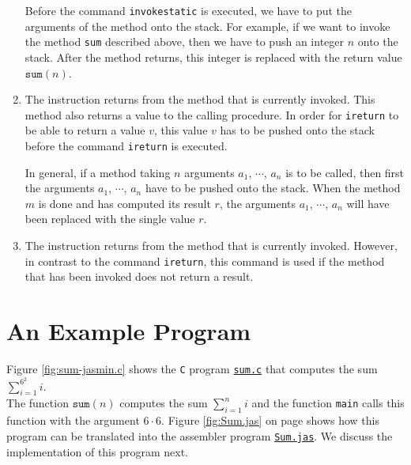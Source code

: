 \begin{enumerate}
      Before the command \texttt{invokestatic} is executed, we have to put the arguments of the method
      onto the stack.  For example, if we want to invoke the method \texttt{sum} described  above, then we
      have to push an integer $n$ onto the stack.  After the method returns, this integer is replaced with the
      return value $\mathtt{sum}(n)$.
\item The instruction 
      returns from the method that is currently invoked.  This method also returns a value to the calling
      procedure.  In order for \texttt{ireturn} to be able to return a value $v$, this value $v$ has to be
      pushed onto the stack before the command \texttt{ireturn} is executed.

      In general, if a method taking $n$ arguments $a_1$, $\cdots$, $a_n$ is to be called, then first the
      arguments $a_1$, $\cdots$, $a_n$ have to be pushed onto the stack.  When the method $m$ is done and
      has computed its result $r$, the arguments $a_1$, $\cdots$, $a_n$ will have been replaced with the
      single value $r$.
\item The instruction 
      returns from the method that is currently invoked.  However, in contrast to the command
      \texttt{ireturn}, this command is used if the method that has been invoked  does not return a result. 
\end{enumerate}

\section{An Example Program}
Figure \ref{fig:sum-jasmin.c} shows the \texttt{C} program 
\href{https://github.com/karlstroetmann/Formal-Languages/tree/master/Jasmin/sum.c}{\texttt{sum.c}}
that computes the sum
\\[0.2cm]
\hspace*{1.3cm}
$\sum\limits_{i=1}^{6^2} i$.
\\[0.2cm]
The function $\mathtt{sum}(n)$ computes the sum $\sum_{i=1}^{n} i$ and the function
\texttt{main} calls this function with the argument $6 \cdot 6$.  Figure \ref{fig:Sum.jas} on page
\pageref{fig:Sum.jas} shows how this program can be translated 
into the assembler program 
\href{https://github.com/karlstroetmann/Formal-Languages/tree/master/Jasmin/Sum.jas}{\texttt{Sum.jas}}.
We discuss the implementation of this program next. 


